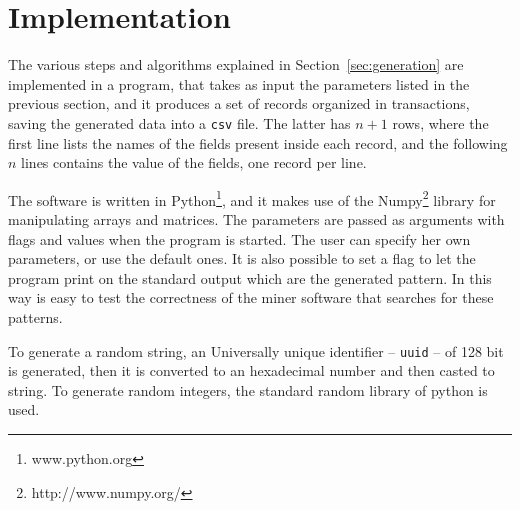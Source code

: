 \documentclass{acm_proc_article-sp-sigmod09}
\begin{document}
\section{Implementation}
The various steps and algorithms explained in Section~\ref{sec:generation} are implemented in a program, that takes as input the parameters listed in the previous section, and it produces a set of records organized in transactions, saving the generated data into a \texttt{csv} file. The latter has $n + 1$ rows, where the first line lists the names of the fields present inside each record, and the following $n$ lines contains the value of the fields, one record per line.

The software is written in Python\footnote{www.python.org}, and it makes use of the Numpy\footnote{http://www.numpy.org/} library \cite{oliphant2006guide} for manipulating arrays and matrices. The parameters are passed as arguments with flags and values when the program is started. The user can specify her own parameters, or use the default ones. It is also possible to set a flag to let the program print on the standard output which are the generated pattern. In this way is easy to test the correctness of the miner software that searches for these patterns.

To generate a random string, an Universally unique identifier -- \texttt{uuid} -- of 128 bit is generated, then it is converted to an hexadecimal number and then casted to string. To generate random integers, the standard random library of python is used.
\end{document}
